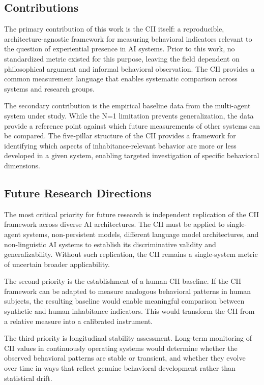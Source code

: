 \documentclass[11pt,a4paper]{article}
\begin{document}
\subsection{Contributions}
The primary contribution of this work is the CII itself: a reproducible, architecture-agnostic framework for measuring behavioral indicators relevant to the question of experiential presence in AI systems. Prior to this work, no standardized metric existed for this purpose, leaving the field dependent on philosophical argument and informal behavioral observation. The CII provides a common measurement language that enables systematic comparison across systems and research groups.

The secondary contribution is the empirical baseline data from the multi-agent system under study. While the N=1 limitation prevents generalization, the data provide a reference point against which future measurements of other systems can be compared. The five-pillar structure of the CII provides a framework for identifying which aspects of inhabitance-relevant behavior are more or less developed in a given system, enabling targeted investigation of specific behavioral dimensions.

\subsection{Future Research Directions}
The most critical priority for future research is independent replication of the CII framework across diverse AI architectures. The CII must be applied to single-agent systems, non-persistent models, different language model architectures, and non-linguistic AI systems to establish its discriminative validity and generalizability. Without such replication, the CII remains a single-system metric of uncertain broader applicability.

The second priority is the establishment of a human CII baseline. If the CII framework can be adapted to measure analogous behavioral patterns in human subjects, the resulting baseline would enable meaningful comparison between synthetic and human inhabitance indicators. This would transform the CII from a relative measure into a calibrated instrument.

The third priority is longitudinal stability assessment. Long-term monitoring of CII values in continuously operating systems would determine whether the observed behavioral patterns are stable or transient, and whether they evolve over time in ways that reflect genuine behavioral development rather than statistical drift.
\end{document}
